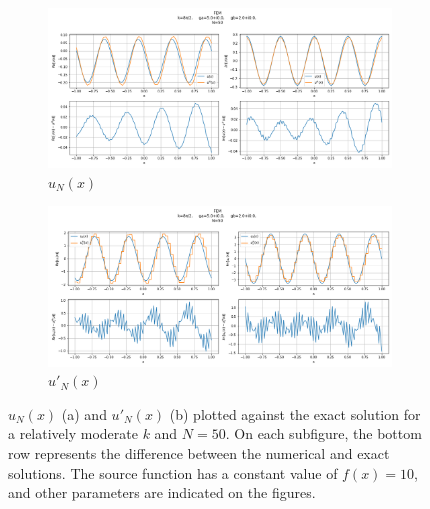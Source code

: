 \begin{figure}[h!]
    \centering
    \begin{subfigure}[b]{0.7\textwidth}
        \includegraphics[width=\textwidth]{img/FEM-Const-MidFreq-N0050-sol.png}
        \caption{$u_N(x)$}
    \end{subfigure}
    \vfill
    \begin{subfigure}[b]{0.7\textwidth}
        \includegraphics[width=\textwidth]{img/FEM-Const-MidFreq-N0050-der.png}
        \caption{$u'_N(x)$}
    \end{subfigure}
    \caption{$u_N(x)$ (a) and $u'_N(x)$ (b) plotted against the exact solution for a relatively moderate $k$ and $N=50$. On each subfigure, the bottom row represents the difference between the numerical and exact solutions. The source function has a constant value of $f(x)=10$, and other parameters are indicated on the figures.}
    \label{fig:femMidfreqN050}
\end{figure}
